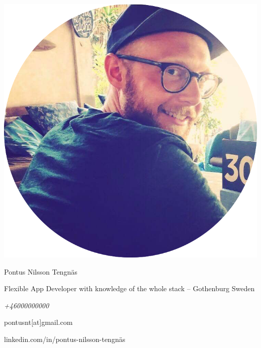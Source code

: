 \begin{minipage}{0.4\textwidth}
  \includegraphics[width=\linewidth]{../img/me.png}
\end{minipage}
\hspace{1.0cm}\begin{minipage}{0.5\textwidth}
  {\Large Pontus Nilsson Tengnäs}

  Flexible App Developer with knowledge of the whole stack – Gothenburg Sweden
  \newline
  \newline
  {\itshape
  +46000000000

  pontusnt[at]gmail.com

  linkedin.com/in/pontus-nilsson-tengnäs}
 
\end{minipage}